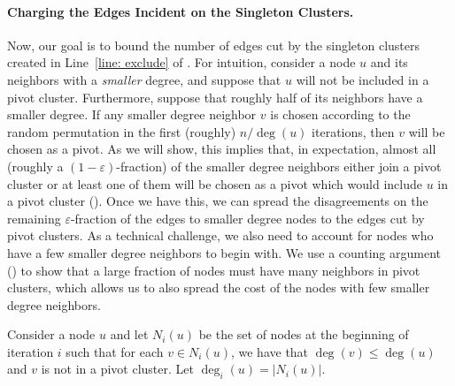 \documentclass[10pt,a4paper]{article}
\newcommand{\eps}{\ensuremath{\varepsilon}}
\begin{document}
\paragraph{Charging the Edges Incident on the Singleton Clusters.}
Now, our goal is to bound the number of edges cut by the singleton clusters created in Line~\ref{line: exclude} of .
For intuition, consider a node $u$ and its neighbors with a \emph{smaller} degree, and suppose that $u$ will not be included in a pivot cluster.
Furthermore, suppose that roughly half of its neighbors have a smaller degree.
If any smaller degree neighbor $v$ is chosen according to the random permutation in the first (roughly) $n / \deg(u)$ iterations, then $v$ will be chosen as a pivot.
As we will show, this implies that, in expectation, almost all (roughly a $(1-\eps)$-fraction) of the smaller degree neighbors either join a pivot cluster or at least one of them will be chosen as a pivot which would include $u$ in a pivot cluster ().
Once we have this, we can spread the disagreements on the remaining $\eps$-fraction of the edges to smaller degree nodes to the edges cut by pivot clusters.
As a technical challenge, we also need to account for nodes who have a few smaller degree neighbors to begin with.
We use a counting argument () to show that a large fraction of nodes must have many neighbors in pivot clusters, which allows us to also spread the cost of the nodes with few smaller degree neighbors.

Consider a node $u$ and let $N_i(u)$ be the set of nodes at the beginning of iteration $i$ such that for each $v \in N_i(u)$, we have that $\deg(v) \leq \deg(u)$ and $v$ is not in a pivot cluster. Let $\deg_i(u) = |N_i(u)|$.
    
\end{document}
